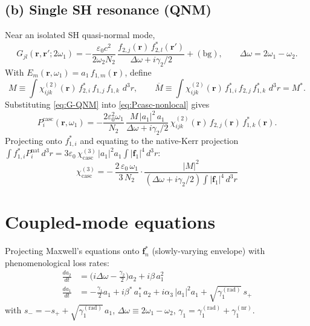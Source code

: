 \documentclass[11pt,a4paper]{article}
\newcommand{\eps}{\varepsilon}
\newcommand{\bvec}[1]{\mathbf{#1}}
\newcommand{\f}{\bvec{f}}
\newcommand{\ri}{\bvec{r}}
\newcommand{\dthreer}{\,d^{3}r}
\newcommand{\chitwo}{\chi^{(2)}}
\newcommand{\chithree}{\chi^{(3)}}
\newcommand{\Dom}{\Delta\omega}
\begin{document}
\subsection*{(b) Single SH resonance (QNM)}
Near an isolated SH quasi-normal mode,
\begin{equation}
  G_{jl}(\ri,\ri';2\omega_1)=
  -\frac{\eps_0c^2}{2\omega_2N_2}\,
  \frac{f_{2,j}(\ri)\,f_{2,l}^*(\ri')}{\Dom+i\gamma_2/2}+(\text{bg}),
  \qquad \Dom=2\omega_1-\omega_2.
\label{eq:G-QNM}
\end{equation}
With $E_m(\ri,\omega_1)=a_1\,f_{1,m}(\ri)$, define
\begin{equation}
  M\equiv\!\int\!\chitwo_{ijk}(\ri)\,f_{2,i}^*\,f_{1,j}\,f_{1,k}\,\dthreer,
  \qquad
  \overline M\equiv\!\int\!\chitwo_{ijk}(\ri)\,f_{1,i}^*\,f_{2,j}\,f_{1,k}^*\,\dthreer=M^*.
  \label{eq:M-overline-M}
\end{equation}
Substituting \eqref{eq:G-QNM} into \eqref{eq:Pcasc-nonlocal} gives
\begin{equation}
  P_i^{\text{casc}}(\ri,\omega_1)=-\frac{2\eps_0^2\omega_1}{N_2}\,
    \frac{M\,|a_1|^{2}\,a_1}{\Dom+i\gamma_2/2}\,
    \chitwo_{ijk}(\ri)\,f_{2,j}(\ri)\,f_{1,k}^{*}(\ri).
  \label{eq:Pcasc-modal}
\end{equation}
Projecting onto $f_{1,i}^*$ and equating to the native-Kerr projection
$\int f_{1,i}^* P_i^\text{nat}\dthreer=3\eps_0\,\chithree_\text{casc}\,|a_1|^2 a_1\!\int|\f_1|^4\dthreer$:
\begin{equation}
  \boxed{\;\chithree_{\text{casc}}=
    -\,\frac{2\,\eps_0\,\omega_1}{3\,N_2}\cdot
    \frac{|M|^2}{(\Dom+i\gamma_2/2)\!\int\!|\f_1|^4\dthreer}\;}
  \label{eq:chi3casc-tensor}
\end{equation}

\section{Coupled-mode equations}\label{sec:tcmt}

Projecting Maxwell's equations onto $\f_n^*$ (slowly-varying envelope) with phenomenological loss rates:
\begin{align}
  \frac{da_2}{dt}&=\bigl(i\Dom-\tfrac{\gamma_2}{2}\bigr)a_2+i\beta\,a_1^2\label{eq:a2}\\[2pt]
  \frac{da_1}{dt}&=-\tfrac{\gamma_1}{2}a_1+i\beta^*\,a_1^*\,a_2+i\alpha_3\,|a_1|^2 a_1+\sqrt{\gamma_1^{(\text{rad})}}\,s_+\label{eq:a1}
\end{align}
with $s_-=-s_++\sqrt{\gamma_1^{(\text{rad})}}\,a_1$, $\Dom\equiv 2\omega_1-\omega_2$, $\gamma_1=\gamma_1^{(\text{rad})}+\gamma_1^{(\text{nr})}$.
\end{document}
